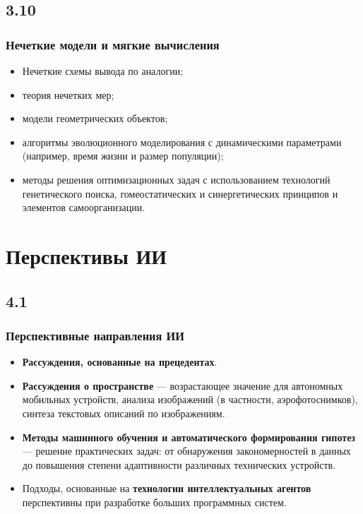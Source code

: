 \documentclass[default]{beamer}
\begin{document}
	\subsection{3.10}
	\begin{frame}
		\frametitle{Нечеткие модели и мягкие вычисления}
		
		\Large 
		\begin{itemize}
			\item Нечеткие схемы вывода по аналогии;
			\item теория нечетких мер; 
			\item модели геометрических объектов;
			\item алгоритмы эволюционного моделирования с динамическими параметрами (например, время жизни и размер популяции);
			\item методы решения оптимизационных задач с использованием технологий генетического поиска, гомеостатических и синергетических принципов и элементов самоорганизации. 
		\end{itemize}
		
	\end{frame}

	\section{Перспективы ИИ}
	\subsection{4.1}
	\begin{frame}
		\frametitle{Перспективные направления ИИ}
		
		\begin{itemize}
			\item \textbf{Рассуждения, основанные на прецедентах}.
			\item \textbf{Рассуждения о пространстве} --- возрастающее значение для автономных мобильных устройств, анализа изображений (в частности, аэрофотоснимков), синтеза текстовых описаний по изображениям.
			\item \textbf{Методы машинного обучения и автоматического формирования гипотез} --- решение практических задач: от обнаружения  закономерностей в данных до повышения степени адаптивности различных технических устройств.
			\item Подходы, основанные на \textbf{технологии интеллектуальных агентов} перспективны при разработке больших программных систем.
			
		\end{itemize}
		
	\end{frame}
\end{document}
